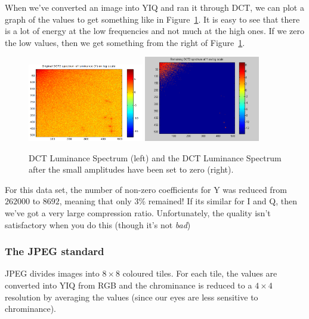 When we've converted an image into YIQ and ran it through DCT, we can plot a
graph of the values to get something like in Figure~\ref{fig:lum}. It is easy to
see that there is a lot of energy at the low frequencies and not much at the
high ones. If we zero the low values, then we get something from
the right of Figure~\ref{fig:lum}.

\begin{figure}[ht]
  \centering
  \includegraphics[width=0.45\textwidth]{images/lum}
  \includegraphics[width=0.45\textwidth]{images/lum-zero}
  \caption{DCT Luminance Spectrum (left) and the DCT Luminance Spectrum after
  the small amplitudes have been set to zero (right).}
  \label{fig:lum}
\end{figure}


For this data set, the number of non-zero coefficients for Y was reduced from
$262000$ to $8692$, meaning that only $3\%$ remained! If its similar for I and
Q, then we've got a very large compression ratio. Unfortunately, the quality
isn't satisfactory when you do this (though it's not \textit{bad})

\subsubsection{The JPEG standard}

JPEG divides images into $8 \times 8$ coloured tiles. For each tile, the values
are converted into YIQ from RGB and the chrominance is reduced to a $4 \times 4$
resolution by averaging the values (since our eyes are less sensitive to
chrominance).

